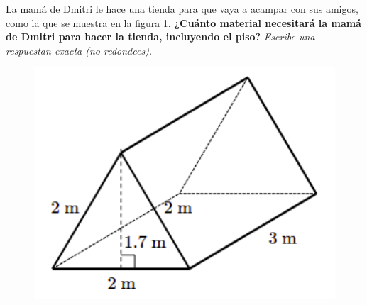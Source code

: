 \question[10] La mamá de Dmitri le hace una tienda para que vaya a acampar con sus amigos,
como la que se muestra en la figura \ref{fig:prob_verb_superficie_03}.
\textbf{¿Cuánto material necesitará la mamá de Dmitri para hacer la tienda, incluyendo el piso?}
\textit{Escribe una respuestan exacta (no redondees).}

\begin{minipage}{0.3\linewidth}
    \begin{figure}[H]
        \begin{center}
            \includegraphics[width=1\textwidth]{../images/prob_verb_superficie_03}
        \end{center}
        \caption{}
        \label{fig:prob_verb_superficie_03}
    \end{figure}
\end{minipage}
\begin{minipage}{0.7\linewidth}
    \begin{solutionbox}{6cm}
    \end{solutionbox}
\end{minipage}